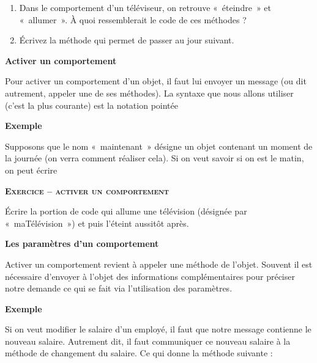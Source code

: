\begin{enumerate}
	\item 
		Dans le comportement d'un téléviseur, on retrouve
		«~éteindre~» et «~allumer~». À quoi ressemblerait le code de ces
		méthodes ?
	\item 
		Écrivez la méthode qui permet de passer au jour suivant.
\end{enumerate}

\bigskip

{\sffamily\bfseries
Activer un comportement}

{
Pour activer un comportement d'un objet, il faut lui
envoyer un message (ou dit autrement, appeler une de ses méthodes). La
syntaxe que nous allons utiliser (c'est la plus
courante) est la notation pointée}


{\bfseries
Exemple}

{
Supposons que le nom «~maintenant~» désigne un objet contenant un moment
de la journée (on verra comment réaliser cela). Si on veut savoir si on
est le matin, on peut écrire}



\bigskip

{\sffamily\bfseries\scshape
Exercice – activer un comportement}

Écrire la portion de code qui allume une télévision (désignée par
«~maTélévision~») et puis l'éteint aussitôt après.


\bigskip

{\sffamily\bfseries\upshape
Les paramètres d'un comportement}

{
Activer un comportement revient à appeler une méthode de
l'objet. Souvent il est nécessaire
d'envoyer à l'objet des informations
complémentaires pour préciser notre demande ce qui se fait via
l'utilisation des paramètres.}

{\bfseries
Exemple}

Si on veut modifier le salaire d'un employé, il faut
que notre message contienne le nouveau salaire. Autrement dit, il faut
communiquer ce nouveau salaire à la méthode de changement du salaire.
Ce qui donne la méthode suivante :


